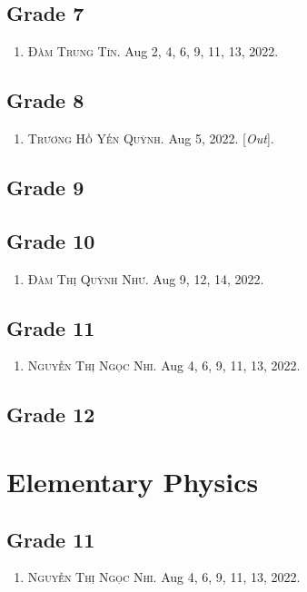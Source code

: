 \documentclass{article}
\numberwithin{equation}{section}
\begin{document}
\subsection{Grade 7}
\begin{enumerate}
	\item \textsc{Đàm Trung Tín.} Aug 2, 4, 6, 9, 11, 13, 2022.
\end{enumerate}

\subsection{Grade 8}
\begin{enumerate}
	\item \textsc{Trương Hồ Yến Quỳnh.} Aug 5, 2022. [\textit{Out}].
\end{enumerate}

\subsection{Grade 9}

\subsection{Grade 10}
\begin{enumerate}
	\item \textsc{Đàm Thị Quỳnh Như.} Aug 9, 12, 14, 2022.
\end{enumerate}

\subsection{Grade 11}
\begin{enumerate}
	\item \textsc{Nguyễn Thị Ngọc Nhi.} Aug 4, 6, 9, 11, 13, 2022.
\end{enumerate}

\subsection{Grade 12}

\section{Elementary Physics}

\subsection{Grade 11}
\begin{enumerate}
	\item \textsc{Nguyễn Thị Ngọc Nhi.} Aug 4, 6, 9, 11, 13, 2022.
\end{enumerate}
\end{document}
